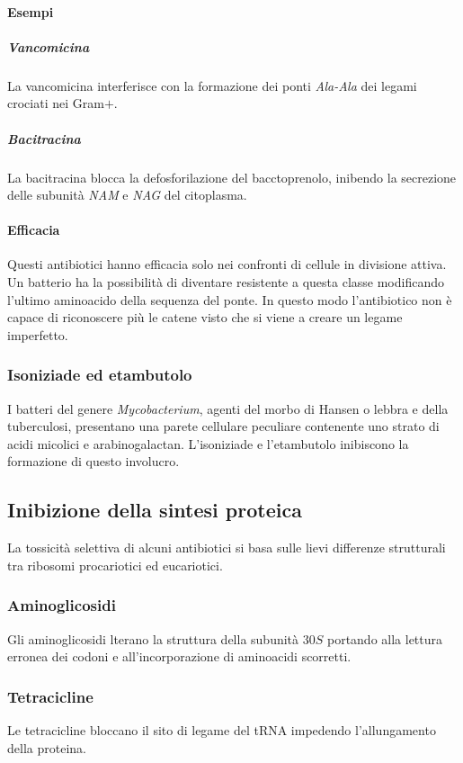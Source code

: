 			\paragraph{Esempi}

				\subparagraph{Vancomicina}
				La vancomicina interferisce con la formazione dei ponti \emph{Ala-Ala} dei legami crociati nei Gram$+$. 

				\subparagraph{Bacitracina}
				La bacitracina blocca la defosforilazione del bacctoprenolo, inibendo la secrezione delle subunità \emph{NAM} e \emph{NAG} del citoplasma. 

			\paragraph{Efficacia}
			Questi antibiotici hanno efficacia solo nei confronti di cellule in divisione attiva.
			Un batterio ha la possibilità di diventare resistente a questa classe modificando l'ultimo aminoacido della sequenza del ponte. 
			In questo modo l'antibiotico non è capace di riconoscere più le catene visto che si viene a creare un legame imperfetto.

		\subsubsection{Isoniziade ed etambutolo}
		I batteri del genere \textit{Mycobacterium}, agenti del morbo di Hansen o lebbra e della tuberculosi, presentano una parete cellulare peculiare contenente uno strato di acidi micolici e arabinogalactan. 
		L'isoniziade e l'etambutolo inibiscono la formazione di questo involucro. 

	\subsection{Inibizione della sintesi proteica}
	La tossicità selettiva di alcuni antibiotici si basa sulle lievi differenze strutturali tra ribosomi procariotici ed eucariotici. 

		\subsubsection{Aminoglicosidi}
		Gli aminoglicosidi lterano la struttura della subunit\`a $30S$ portando alla lettura erronea dei codoni e all'incorporazione di aminoacidi scorretti.
		
		\subsubsection{Tetracicline}
		Le tetracicline bloccano il sito di legame del tRNA impedendo l'allungamento della proteina.

